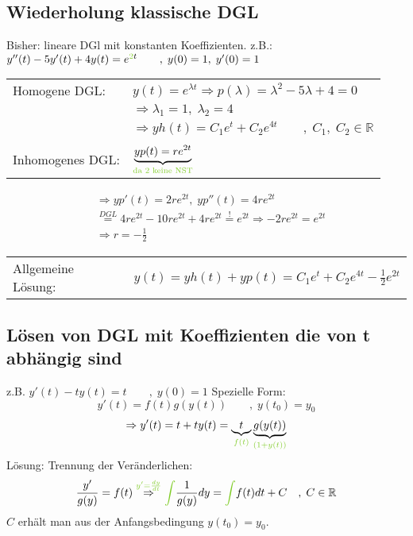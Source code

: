 \documentclass[12pt,a4paper]{article}%
\numberwithin{equation}{section}
\newcommand{\R}{\mathbb{R}} %
\def\colGreen#1{\begingroup\color{LimeGreen}{#1}\endgroup}
\def\ubGreen#1#2{\underbrace{#2}_{\colGreen{#1}}}
\numberwithin{equation}{subsection}
\begin{document}
  \subsection{Wiederholung klassische DGL}
  Bisher: lineare DGl mit konstanten Koeffizienten. \newline
  z.B.: $y''(t) - 5y'(t) + 4y(t) = e^{\colGreen{2}t} \qquad ,\; y(0) = 1,\; y'(0) = 1$ \newline
  \begin{tabularx}{14.7cm}{l l}
	  Homogene DGL: & $y(t) = e^{\lambda t} \Rightarrow p(\lambda) = \lambda^2 - 5 \lambda +4 = 0$ \\
	  $\;$ & $\Rightarrow \lambda_1 = 1, \; \lambda_2 = 4$ \\
	  $\;$ & $\Rightarrow yh(t) = C_1 e^t + C_2 e^{4t} \qquad ,\;C_1,\;C_2 \in \R$\\
	  $\;$ & $\;$ \\
	  Inhomogenes DGL: & $\ubGreen{\text{da 2 keine NST}}{yp(t) = re^{2t}}$\\
  \end{tabularx}  
  \begin{align*}
    &\Rightarrow yp'(t) = 2re^{2t},\; yp''(t) = 4re^{2t} \\
    &\overset{DGL}{=} 4re^{2t} - 10re^{2t} + 4re^{2t} \overset{!}{=} e^{2t} \Rightarrow -2re^{2t} = e^{2t}\\
    &\Rightarrow r = -\frac{1}{2}
  \end{align*} 
  \begin{tabularx}{14.7cm}{l l}
	  Allgemeine Lösung: & $y(t) = yh(t) + yp(t) = C_1 e^t + C_2 e^{4t} - \frac{1}{2} e^{2t}$
  \end{tabularx}
  
  \subsection{Lösen von DGL mit Koeffizienten die von t abhängig sind}
  z.B. $ y'(t) - ty(t) = t \qquad ,\; y(0) = 1$\newline
  \newline
  Spezielle Form: 
  \begin{equation}
    y'(t) = f(t) g(y(t)) \qquad,\; y(t_0) = y_0
  \end{equation}     
  \begin{align*}
    \Rightarrow y'(t) = t+ty(t) = \ubGreen{f(t)}{t} \ubGreen{(1+y(t))}{g(y(t))}
  \end{align*}
  Lösung: Trennung der Veränderlichen:
  \begin{align}
  \frac{y'}{g(y)} = f(t) \overset{\colGreen{y' = \frac{dy}{dt}}}{\Rightarrow} \colGreen{\int} \frac{1}{g(y)} dy = \colGreen{\int} f(t)dt +C \quad ,\;C\in\R
  \end{align}
  $C$ erhält man aus der Anfangsbedingung $y(t_0) = y_0$.
\end{document}

